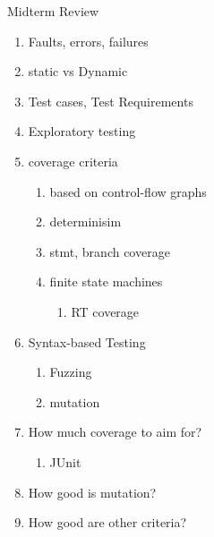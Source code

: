 \documentclass[10pt,usletter]{article}
\begin{document}
Midterm Review
\begin{enumerate}
\item Faults, errors, failures
\item static vs Dynamic
\item Test cases, Test Requirements
\item Exploratory testing
\item coverage criteria
\begin{enumerate}
\item based on control-flow graphs
\item determinisim
\item stmt, branch coverage
\item finite state machines
\begin{enumerate}
\item RT coverage
\end{enumerate}
\end{enumerate}
\item Syntax-based Testing
\begin{enumerate}
\item Fuzzing
\item mutation
\end{enumerate}
\item How much coverage to aim for?
\begin{enumerate}
\item JUnit
\end{enumerate}
\item How good is mutation?
\item How good are other criteria?
\end{enumerate}
\end{document}
